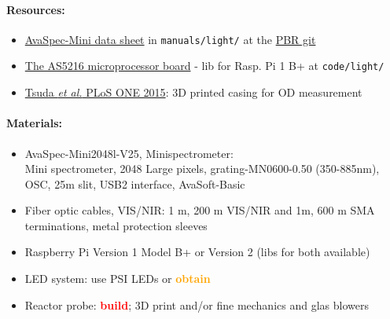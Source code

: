 \documentclass[12pt,a4paper]{scrartcl}
\newcommand{\git}[0]{\href{https://github.com/raim/PBR}{PBR git}}
\newcommand{\obtain}[0]{\textcolor{orange}{\textbf{obtain}}}
\newcommand{\build}[0]{\textcolor{red}{\textbf{build}}}
\begin{document}
\paragraph{Resources:}
\begin{itemize}
\item
  \href{http://www.avantes.com/images/productsheets/AvaSpec_Mini5.pdf}{AvaSpec-Mini
    data sheet} in \texttt{manuals/light/} at the \git{}
\item \href{http://www.avantes.com/products/oem/item/220-oem-spectrometers-as5216-microprocessor-board}{The AS5216 microprocessor board} - lib for Rasp. Pi 1 B+ at \texttt{code/light/}
\item \href{http://www.ncbi.nlm.nih.gov/pmc/articles/PMC4641590/}{Tsuda
    \textit{et al.} PLoS ONE 2015}: 3D printed casing for OD measurement
\end{itemize}

\paragraph{Materials:}
\begin{itemize}
\item AvaSpec-Mini2048l-V25, Minispectrometer:\\ Mini
  spectrometer, 2048 Large pixels, grating-MN0600-0.50 (350-885nm),
  OSC, 25\textmu{}m slit, USB2 interface, AvaSoft-Basic
\item Fiber optic cables, VIS/NIR: 1 m, 200 \textmu{}m VIS/NIR and 1m,
  600 \textmu{}m
  SMA terminations, metal protection sleeves
\item Raspberry Pi Version 1 Model B+ or Version 2 (libs for both available) 
\item LED system: use PSI LEDs or \obtain{}
\item Reactor probe: \build{}; 3D print and/or fine mechanics and glas
  blowers
\end{itemize}
\end{document}
